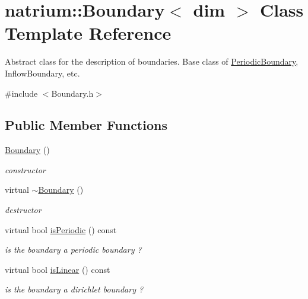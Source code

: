 \hypertarget{classnatrium_1_1Boundary}{
\section{natrium::Boundary$<$ dim $>$ Class Template Reference}
\label{classnatrium_1_1Boundary}
}


Abstract class for the description of boundaries. Base class of \hyperlink{classnatrium_1_1PeriodicBoundary}{PeriodicBoundary}, InflowBoundary, etc.  


{\ttfamily \#include $<$Boundary.h$>$}\subsection*{Public Member Functions}
\begin{DoxyCompactItemize}
\item 
\hypertarget{classnatrium_1_1Boundary_a987978143b16ef0bbadd2b465dc1882d}{
\hyperlink{classnatrium_1_1Boundary_a987978143b16ef0bbadd2b465dc1882d}{Boundary} ()}
\label{classnatrium_1_1Boundary_a987978143b16ef0bbadd2b465dc1882d}

\begin{DoxyCompactList}\small\item\em constructor \item\end{DoxyCompactList}\item 
\hypertarget{classnatrium_1_1Boundary_a534f7d32a140c0764c61dce6129bf88f}{
virtual \hyperlink{classnatrium_1_1Boundary_a534f7d32a140c0764c61dce6129bf88f}{$\sim$Boundary} ()}
\label{classnatrium_1_1Boundary_a534f7d32a140c0764c61dce6129bf88f}

\begin{DoxyCompactList}\small\item\em destructor \item\end{DoxyCompactList}\item 
\hypertarget{classnatrium_1_1Boundary_acb651f4148b4e00f08258e1321c43235}{
virtual bool \hyperlink{classnatrium_1_1Boundary_acb651f4148b4e00f08258e1321c43235}{isPeriodic} () const }
\label{classnatrium_1_1Boundary_acb651f4148b4e00f08258e1321c43235}

\begin{DoxyCompactList}\small\item\em is the boundary a periodic boundary ? \item\end{DoxyCompactList}\item 
\hypertarget{classnatrium_1_1Boundary_aa76ef0eef351680cadb6299dca94ee89}{
virtual bool \hyperlink{classnatrium_1_1Boundary_aa76ef0eef351680cadb6299dca94ee89}{isLinear} () const }
\label{classnatrium_1_1Boundary_aa76ef0eef351680cadb6299dca94ee89}

\begin{DoxyCompactList}\small\item\em is the boundary a dirichlet boundary ? \item\end{DoxyCompactList}\end{DoxyCompactItemize}



